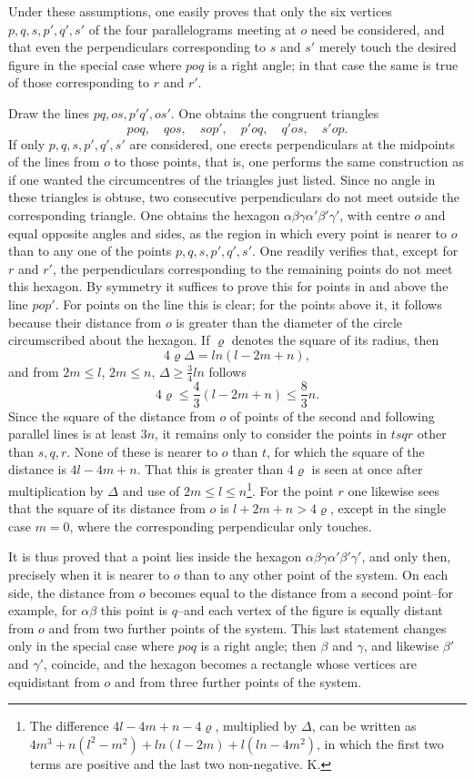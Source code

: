 \documentclass[11pt]{article}
\begin{document}
Under these assumptions, one easily proves that only the six vertices $p,q,s,p',q',s'$ of the four parallelograms meeting at $o$ need be considered, and that even the perpendiculars corresponding to $s$ and $s'$ merely touch the desired figure in the special case where $poq$ is a right angle; in that case the same is true of those corresponding to $r$ and $r'$.

Draw the lines $pq,os,p'q',os'$. One obtains the congruent triangles
\[
 poq,
 \quad qos,
 \quad sop',
 \quad p'oq,
 \quad q'os,
 \quad s'op.
\]
If only $p,q,s,p',q',s'$ are considered, one erects perpendiculars at the midpoints of the lines from $o$ to those points, that is, one performs the same construction as if one wanted the circumcentres of the triangles just listed. Since no angle in these triangles is obtuse, two consecutive perpendiculars do not meet outside the corresponding triangle. One obtains the hexagon $\alpha\beta\gamma\alpha'\beta'\gamma'$, with centre $o$ and equal opposite angles and sides, as the region in which every point is nearer to $o$ than to any one of the points $p,q,s,p',q',s'$. One readily verifies that, except for $r$ and $r'$, the perpendiculars corresponding to the remaining points do not meet this hexagon. By symmetry it suffices to prove this for points in and above the line $pop'$. For points on the line this is clear; for the points above it, it follows because their distance from $o$ is greater than the diameter of the circle circumscribed about the hexagon. If $\varrho$ denotes the square of its radius, then
\[
 4\varrho\Delta=ln(l-2m+n),
\]
and from $2m\le l$, $2m\le n$, $\Delta\ge\frac34 ln$ follows
\[
 4\varrho\le \frac43(l-2m+n)\le \frac83 n.
\]
Since the square of the distance from $o$ of points of the second and following parallel lines is at least $3n$, it remains only to consider the points in $tsqr$ other than $s,q,r$. None of these is nearer to $o$ than $t$, for which the square of the distance is $4l-4m+n$. That this is greater than $4\varrho$ is seen at once after multiplication by $\Delta$ and use of $2m\le l\le n$\footnote{The difference $4l-4m+n-4\varrho$, multiplied by $\Delta$, can be written as $4m^3+n(l^2-m^2)+ln(l-2m)+l(ln-4m^2)$, in which the first two terms are positive and the last two non-negative. K.}. For the point $r$ one likewise sees that the square of its distance from $o$ is $l+2m+n>4\varrho$, except in the single case $m=0$, where the corresponding perpendicular only touches.

It is thus proved that a point lies inside the hexagon $\alpha\beta\gamma\alpha'\beta'\gamma'$, and only then, precisely when it is nearer to $o$ than to any other point of the system. On each side, the distance from $o$ becomes equal to the distance from a second point--for example, for $\alpha\beta$ this point is $q$--and each vertex of the figure is equally distant from $o$ and from two further points of the system. This last statement changes only in the special case where $poq$ is a right angle; then $\beta$ and $\gamma$, and likewise $\beta'$ and $\gamma'$, coincide, and the hexagon becomes a rectangle whose vertices are equidistant from $o$ and from three further points of the system.
\end{document}
